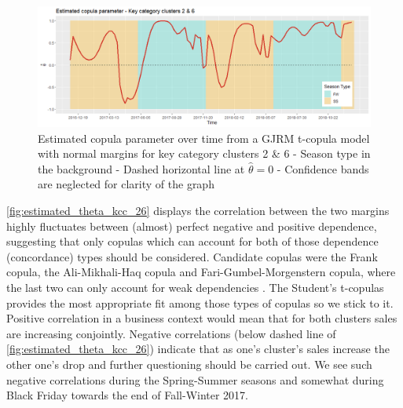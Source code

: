 \begin{figure}[H]
\centering
  \includegraphics[width=0.95\linewidth]{figures/estimated_theta_kcc_26.png}
  \caption{Estimated copula parameter over time from a \ac{GJRM} t-copula model with normal margins for key category clusters 2 \& 6 - Season type in the background - Dashed horizontal line at $\hat{\theta} = 0$ - Confidence bands are neglected for clarity of the graph}
  \label{fig:estimated_theta_kcc_26}
\end{figure}

\autoref{fig:estimated_theta_kcc_26} displays the correlation between the two margins highly fluctuates between (almost) perfect negative and positive dependence, suggesting that only copulas which can account for both of those dependence (concordance) types should be considered. Candidate copulas were the Frank copula, the Ali-Mikhali-Haq copula and Fari-Gumbel-Morgenstern copula, where the last two can only account for weak dependencies \citep{marra1605bivariate}. The Student's t-copulas provides the most appropriate fit among those types of copulas so we stick to it. \\

Positive correlation in a business context would mean that for both clusters sales are increasing conjointly. Negative correlations (below dashed line of \autoref{fig:estimated_theta_kcc_26}) indicate that as one's cluster's sales increase the other one's drop and further questioning should be carried out. We see such negative correlations during the Spring-Summer seasons and somewhat during Black Friday towards the end of Fall-Winter 2017.


